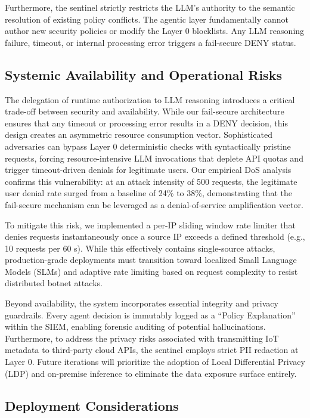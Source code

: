 \documentclass[
]{ceurart}
\begin{document}
Furthermore, the sentinel strictly restricts the LLM's authority to the semantic resolution of existing policy conflicts. The agentic layer fundamentally cannot author new security policies or modify the Layer 0 blocklists. Any LLM reasoning failure, timeout, or internal processing error triggers a fail-secure DENY status.

\subsection{Systemic Availability and Operational Risks}

The delegation of runtime authorization to LLM reasoning introduces a critical trade-off between security and availability. While our fail-secure architecture ensures that any timeout or processing error results in a DENY decision, this design creates an asymmetric resource consumption vector. Sophisticated adversaries can bypass Layer 0 deterministic checks with syntactically pristine requests, forcing resource-intensive LLM invocations that deplete API quotas and trigger timeout-driven denials for legitimate users. Our empirical DoS analysis confirms this vulnerability: at an attack intensity of 500 requests, the legitimate user denial rate surged from a baseline of 24\% to 38\%, demonstrating that the fail-secure mechanism can be leveraged as a denial-of-service amplification vector.

To mitigate this risk, we implemented a per-IP sliding window rate limiter that denies requests instantaneously once a source IP exceeds a defined threshold (e.g., 10 requests per 60 s). While this effectively contains single-source attacks, production-grade deployments must transition toward localized Small Language Models (SLMs) and adaptive rate limiting based on request complexity to resist distributed botnet attacks.

Beyond availability, the system incorporates essential integrity and privacy guardrails. Every agent decision is immutably logged as a ``Policy Explanation'' within the SIEM, enabling forensic auditing of potential hallucinations. Furthermore, to address the privacy risks associated with transmitting IoT metadata to third-party cloud APIs, the sentinel employs strict PII redaction at Layer 0. Future iterations will prioritize the adoption of Local Differential Privacy (LDP) and on-premise inference to eliminate the data exposure surface entirely.

\subsection{Deployment Considerations}
\end{document}
